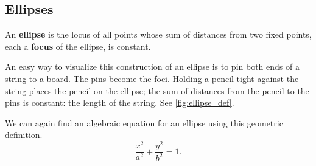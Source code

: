 \subsection{Ellipses}

\begin{definition}[Ellipse]\label{def:ellipse}%
An \textbf{ellipse} is the locus of all points whose sum of distances from two fixed points, each a \textbf{focus} of the ellipse, is constant.
\end{definition}

An easy way to visualize this construction of an ellipse is to pin both ends of a string to a board. The pins become the foci. Holding a pencil tight against the string places the pencil on the ellipse; the sum of distances from the pencil to the pins is constant: the length of the string. See \autoref{fig:ellipse_def}.


We can again find an algebraic equation for an ellipse using this geometric definition.
\iftoggle{abridgeConics}{}{%
Let the foci be located along the $x$-axis, $c$ units from the origin. Let these foci be labeled as $F_1 = (-c,0)$ and $F_2=(c,0)$. Let $P=(x,y)$ be a point on the ellipse. The sum of distances from $F_1$ to $P$ ($d_1$) and from $F_2$ to $P$ ($d_2$) is a constant $d$. That is, $d_1+d_2=d$. Using the Distance Formula, we have 
\[\sqrt{(x+c)^2+y^2} + \sqrt{(x-c)^2+y^2} = d.\]
Using a fair amount of algebra can produce the following equation of an ellipse (note that the equation is an implicitly defined function; it has to be, as an ellipse fails the Vertical Line Test):
\[
\frac{x^2}{\left(\frac d2\right)^2} + \frac{y^2}{\left(\frac d2\right)^2-c^2} = 1.
\]
This is not particularly illuminating, but by making the substitution $a=d/2$ and $b=\sqrt{a^2-c^2}$, we can rewrite the above equation as
}
\[\frac{x^2}{a^2} + \frac{y^2}{b^2} = 1.\]

